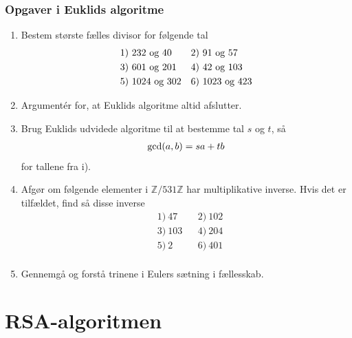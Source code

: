 \documentclass[12pt]{article}
\begin{document}
\subsubsection*{Opgaver i Euklids algoritme}
\begin{enumerate}[label=\roman*)]
\item Bestem største fælles divisor for følgende tal
\begin{align*}
&1)\  232\textnormal{ og } 40   &&2) \  91\textnormal{ og }57  \\
&3)\  601\textnormal{ og }201   &&4) \ 42 \textnormal{ og }103   \\
&5)\   1024\textnormal{ og } 302 &&6) \ 1023 \textnormal{ og } 423  \\
\end{align*}
\item Argumentér for, at Euklids algoritme altid afslutter.
\item Brug Euklids udvidede algoritme til at bestemme tal $s$ og $t$, så 
\begin{align*}
\textnormal{gcd}(a,b) = sa+tb
\end{align*}
for tallene fra i).
\item Afgør om følgende elementer i $\mathbb{Z}/531 \mathbb{Z}$ har multiplikative inverse. Hvis det er tilfældet, find så disse inverse
\begin{align*}
&1) \ 47    &&2) \ 102    \\
&3) \  103   &&4) \ 204    \\
&5) \  2   &&6) \ 401     \\
\end{align*}
\item Gennemgå og forstå trinene i Eulers sætning i fællesskab. 
\end{enumerate}
\newpage
\section{RSA-algoritmen}
\end{document}
